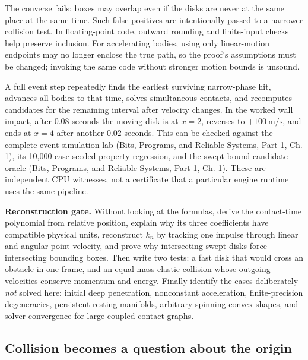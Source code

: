 The converse fails: boxes may overlap even if the disks are never at the same place at the same time. Such false positives are intentionally passed to a narrower collision test. In floating-point code, outward rounding and finite-input checks help preserve inclusion. For accelerating bodies, using only linear-motion endpoints may no longer enclose the true path, so the proof's assumptions must be changed; invoking the same code without stronger motion bounds is unsound.

A full event step repeatedly finds the earliest surviving narrow-phase hit, advances all bodies to that time, solves simultaneous contacts, and recomputes candidates for the remaining interval after velocity changes. In the worked wall impact, after \(0.08\) seconds the moving disk is at \(x=2\), reverses to \(+100\ \mathrm{m/s}\), and ends at \(x=4\) after another \(0.02\) seconds. This can be checked against the \href{../01-Bits-Programs-and-Reliable-Systems-P01/main.pdf\#source-file-ad26f703e8f150d27a72bf93}{complete event simulation lab (Bits, Programs, and Reliable Systems, Part 1, Ch. 1)}, its \hyperref[source-file-50214a688c0ef812f3094877]{10,000-case seeded property regression}, and the \href{../01-Bits-Programs-and-Reliable-Systems-P01/main.pdf\#source-file-6597829be009fc0bb1b17d87}{swept-bound candidate oracle (Bits, Programs, and Reliable Systems, Part 1, Ch. 1)}. These are independent CPU witnesses, not a certificate that a particular engine runtime uses the same pipeline.

\textbf{Reconstruction gate.} Without looking at the formulas, derive the contact-time polynomial from relative position, explain why its three coefficients have compatible physical units, reconstruct \(k_n\) by tracking one impulse through linear and angular point velocity, and prove why intersecting swept disks force intersecting bounding boxes. Then write two tests: a fast disk that would cross an obstacle in one frame, and an equal-mass elastic collision whose outgoing velocities conserve momentum and energy. Finally identify the cases deliberately \emph{not} solved here: initial deep penetration, nonconstant acceleration, finite-precision degeneracies, persistent resting manifolds, arbitrary spinning convex shapes, and solver convergence for large coupled contact graphs.

\subsection{Collision becomes a question about the origin}\label{01-foundations-i-ch018-collision-becomes-a-question-about-the-origin}

